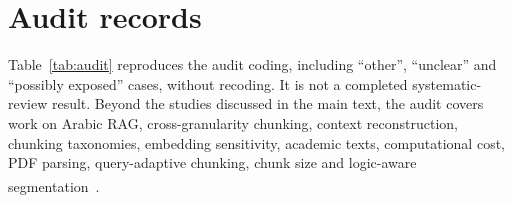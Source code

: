 \documentclass[11pt]{article}
\newcommand{\citeL}[1]{\cite{#1}\textsuperscript{\textcolor{red}{\dag}}}
\begin{document}


\FloatBarrier
\section{Audit records}\label{app:audit}
Table~\ref{tab:audit} reproduces the audit coding, including ``other'', ``unclear'' and ``possibly exposed'' cases,
without recoding. It is not a completed systematic-review result. Beyond the studies discussed in the main text, the
audit covers work on Arabic RAG, cross-granularity chunking, context reconstruction, chunking taxonomies, embedding
sensitivity, academic texts, computational cost, PDF parsing, query-adaptive chunking, chunk size and
logic-aware segmentation~\citeL{arabicrag2025,freechunker2025,reconstructingcontext2025,beyondchunkthenembed2026,chunkembedsensitivity2026,chunkingacademic2026,chunkingcost2026,pdfparsingfin2026,queryadaptivechunking2026,garrido2026chunksize,metachunking2024}.


\end{document}
